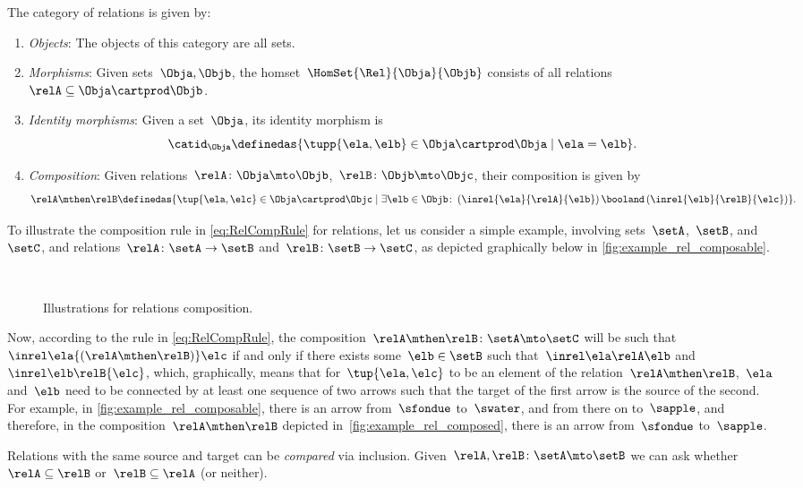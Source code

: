 
\begin{ctdefinition}
	\label{def:Rel}
	The category of relations \iindex{\Rel}  is given by:
	\begin{enumerate}
		\item \emph{Objects}: The objects of this category are all sets.
		\item \emph{Morphisms}: Given sets~$\Obja, \Objb$, the homset~$\HomSet{\Rel}{\Obja}{\Objb}$ consists of all relations~$\relA\subseteq \Obja\cartprod \Objb$.
		\item \emph{Identity morphisms}: Given a set~$\Obja$, its identity morphism is
		\begin{equation}
			\catid_\Obja \definedas \{ \tupp{\ela,\elb} \in \Obja \cartprod \Obja \mid  \ela = \elb \}.
		\end{equation}
		\item \emph{Composition}: Given relations~$\relA \colon \Obja\mto \Objb$,~$\relB \colon \Objb\mto \Objc$, their composition is given by
		\begin{equation}
			\label{eq:RelCompRule}
			\relA \mthen \relB \definedas \{\tup{\ela,\elc} \in \Obja \cartprod \Objc \mid  \exists \elb \in \Objb \colon \left(\inrel{\ela}{\relA}{\elb} \right) \booland \left(\inrel{\elb}{\relB}{\elc}\right)\}.
		\end{equation}
	\end{enumerate}
\end{ctdefinition}

To illustrate the composition rule in \cref{eq:RelCompRule} for relations, let us consider a simple example, involving sets~$\setA$,~$\setB$, and~$\setC$, and relations~$\relA \colon \setA \to \setB$ and~$\relB \colon \setB \to \setC$, as depicted graphically below in \cref{fig:example_rel_composable}.
%
\begin{figure}[h!]
	\centering
	\\
	\caption{Illustrations for relations composition.}

\end{figure}
%
Now, according to the rule in \cref{eq:RelCompRule}, the composition~$\relA \mthen \relB \colon \setA \mto \setC$ will be such that~$\inrel \ela {(\relA \mthen \relB)} \elc$ if and only if there exists some~$\elb \in \setB$ such that~$\inrel \ela \relA \elb $ and~$\inrel \elb \relB{\elc}$, which, graphically, means that for~$\tup{\ela,\elc}$ to be an element of the relation~$\relA \mthen \relB$,~$\ela$ and~$\elb$ need to be connected by at least one sequence of two arrows such that the target of the first arrow is the source of the second.
For example, in \cref{fig:example_rel_composable}, there is an arrow from~$\sfondue$ to~$\swater$, and from there on to~$\sapple$, and therefore, in the composition~$\relA \mthen \relB$ depicted in~\cref{fig:example_rel_composed}, there is an arrow from~$\sfondue$ to~$\sapple$.

\begin{remark}
	Relations with the same source and target can be \emph{compared} via inclusion.
	Given~$\relA, \relB \colon \setA\mto \setB$  we can ask whether~$\relA\subseteq \relB$ or~$\relB\subseteq \relA$ (or neither).
\end{remark}
